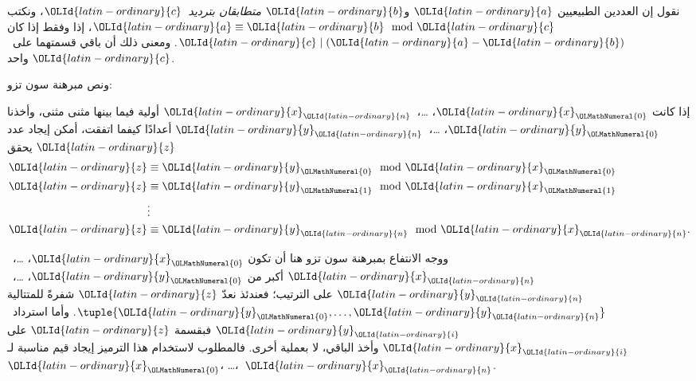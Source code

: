 \documentclass[../../../include/open-logic-section]{subfiles}
\begin{document}
\begin{defn}
نقول إن العددين الطبيعيين ${\OLId{latin-ordinary}{a}}$ و${\OLId{latin-ordinary}{b}}$ \emph{متطابقان بترديد~${\OLId{latin-ordinary}{c}}$}، ونكتب
${\OLId{latin-ordinary}{a}}\equiv {\OLId{latin-ordinary}{b}}\mod {\OLId{latin-ordinary}{c}}$، إذا وفقط إذا كان ${\OLId{latin-ordinary}{c}}\mid({\OLId{latin-ordinary}{a}}-{\OLId{latin-ordinary}{b}})$.
ومعنى ذلك أن باقي قسمتهما على~${\OLId{latin-ordinary}{c}}$ واحد.
\end{defn}

ونص مبرهنة سون تزو:
\begin{thm}
إذا كانت ${\OLId{latin-ordinary}{x}}_{\OLMathNumeral{0}}$، \dots،~${\OLId{latin-ordinary}{x}}_{\OLId{latin-ordinary}{n}}$ أولية فيما بينها مثنى مثنى، وأخذنا
${\OLId{latin-ordinary}{y}}_{\OLMathNumeral{0}}$، \dots،~${\OLId{latin-ordinary}{y}}_{\OLId{latin-ordinary}{n}}$ أعدادًا كيفما اتفقت، أمكن إيجاد عدد ${\OLId{latin-ordinary}{z}}$ يحقق
\begin{align*}
{\OLId{latin-ordinary}{z}} & \equiv {\OLId{latin-ordinary}{y}}_{\OLMathNumeral{0}} \mod {\OLId{latin-ordinary}{x}}_{\OLMathNumeral{0}} \\
{\OLId{latin-ordinary}{z}} & \equiv {\OLId{latin-ordinary}{y}}_{\OLMathNumeral{1}} \mod {\OLId{latin-ordinary}{x}}_{\OLMathNumeral{1}} \\
& \vdots  \\
{\OLId{latin-ordinary}{z}} & \equiv {\OLId{latin-ordinary}{y}}_{\OLId{latin-ordinary}{n}} \mod {\OLId{latin-ordinary}{x}}_{\OLId{latin-ordinary}{n}}.
\end{align*}
\end{thm}

ووجه الانتفاع بمبرهنة سون تزو هنا أن تكون ${\OLId{latin-ordinary}{x}}_{\OLMathNumeral{0}}$، \dots،~${\OLId{latin-ordinary}{x}}_{\OLId{latin-ordinary}{n}}$
أكبر من ${\OLId{latin-ordinary}{y}}_{\OLMathNumeral{0}}$، \dots،~${\OLId{latin-ordinary}{y}}_{\OLId{latin-ordinary}{n}}$ على الترتيب؛ فعندئذ نعدّ ${\OLId{latin-ordinary}{z}}$
شفرةً للمتتالية $\tuple{{\OLId{latin-ordinary}{y}}_{\OLMathNumeral{0}},\dots,{\OLId{latin-ordinary}{y}}_{\OLId{latin-ordinary}{n}}}$. وأما استرداد~${\OLId{latin-ordinary}{y}}_{\OLId{latin-ordinary}{i}}$
فبقسمة ${\OLId{latin-ordinary}{z}}$ على ${\OLId{latin-ordinary}{x}}_{\OLId{latin-ordinary}{i}}$ وأخذ الباقي، لا بعملية أخرى.
فالمطلوب لاستخدام هذا الترميز إيجاد قيم مناسبة لـ${\OLId{latin-ordinary}{x}}_{\OLMathNumeral{0}}$، \dots،~${\OLId{latin-ordinary}{x}}_{\OLId{latin-ordinary}{n}}$.
\end{document}
